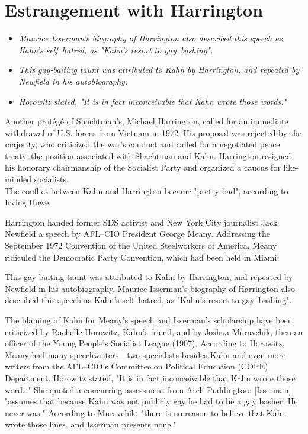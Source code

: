 \section{Estrangement with
Harrington}\label{estrangement-with-harrington}

\begin{itemize}
\item
  \emph{Maurice Isserman's biography of Harrington also described this
  speech as Kahn's self~hatred, as "Kahn's resort to gay~bashing".}
\item
  \emph{This gay-baiting taunt was attributed to Kahn by Harrington, and
  repeated by Newfield in his autobiography.}
\item
  \emph{Horowitz stated, "It is in fact inconceivable that Kahn wrote
  those words."}
\end{itemize}

Another protégé of Shachtman's, Michael Harrington, called for an
immediate withdrawal of U.S. forces from Vietnam in 1972. His proposal
was rejected by the majority, who criticized the war's conduct and
called for a negotiated peace treaty, the position associated with
Shachtman and Kahn. Harrington resigned his honorary chairmanship of the
Socialist Party and organized a caucus for like-minded socialists.\\
The conflict between Kahn and Harrington became "pretty bad", according
to Irving Howe.

Harrington handed former SDS activist and New York City journalist Jack
Newfield a speech by AFL--CIO President George Meany. Addressing the
September 1972 Convention of the United Steelworkers of America, Meany
ridiculed the Democratic Party Convention, which had been held in Miami:

This gay-baiting taunt was attributed to Kahn by Harrington, and
repeated by Newfield in his autobiography. Maurice Isserman's biography
of Harrington also described this speech as Kahn's self~hatred, as
"Kahn's resort to gay~bashing".

The blaming of Kahn for Meany's speech and Isserman's scholarship have
been criticized by Rachelle Horowitz, Kahn's friend, and by Joshua
Muravchik, then an officer of the Young People's Socialist League
(1907). According to Horowitz, Meany had many speechwriters---two
specialists besides Kahn and even more writers from the AFL--CIO's
Committee on Political Education (COPE) Department. Horowitz stated, "It
is in fact inconceivable that Kahn wrote those words." She quoted a
concurring assessment from Arch Puddington: {[}Isserman{]} "assumes that
because Kahn was not publicly gay he had to be a gay basher. He never
was." According to Muravchik, "there is no reason to believe that Kahn
wrote those lines, and Isserman presents none."

